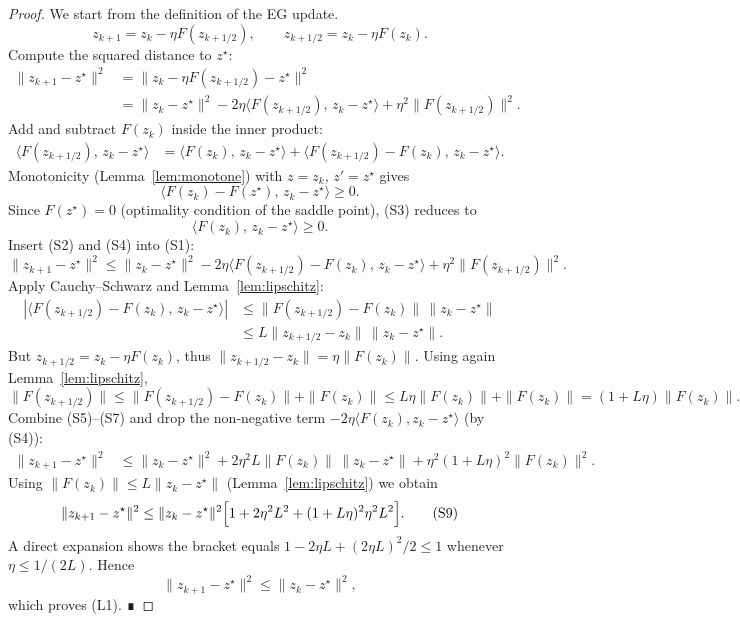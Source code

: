 \documentclass[11pt]{article}
\begin{document}
\begin{proof}
We start from the definition of the EG update.
\[
z_{k+1}=z_k-\eta F(z_{k+1/2}),\qquad 
z_{k+1/2}=z_k-\eta F(z_k).
\]
Compute the squared distance to $z^\star$:
\[
\begin{aligned}
\|z_{k+1}-z^\star\|^2
&=\|z_k-\eta F(z_{k+1/2})-z^\star\|^2\\
&=\|z_k-z^\star\|^2-2\eta\langle F(z_{k+1/2}),\,z_k-z^\star\rangle
   +\eta^2\|F(z_{k+1/2})\|^2. \tag{S1}
\end{aligned}
\]
Add and subtract $F(z_k)$ inside the inner product:
\[
\begin{aligned}
\langle F(z_{k+1/2}),\,z_k-z^\star\rangle
&=\langle F(z_{k}),\,z_k-z^\star\rangle
   +\langle F(z_{k+1/2})-F(z_k),\,z_k-z^\star\rangle. \tag{S2}
\end{aligned}
\]
Monotonicity (Lemma~\ref{lem:monotone}) with $z=z_k$, $z'=z^\star$ gives
\[
\langle F(z_k)-F(z^\star),\,z_k-z^\star\rangle\ge0.
\tag{S3}
\]
Since $F(z^\star)=0$ (optimality condition of the saddle point), (S3) reduces to
\[
\langle F(z_k),\,z_k-z^\star\rangle\ge0. \tag{S4}
\]
Insert (S2) and (S4) into (S1):
\[
\|z_{k+1}-z^\star\|^2
\le \|z_k-z^\star\|^2
   -2\eta\langle F(z_{k+1/2})-F(z_k),\,z_k-z^\star\rangle
   +\eta^2\|F(z_{k+1/2})\|^2. \tag{S5}
\]
Apply Cauchy–Schwarz and Lemma~\ref{lem:lipschitz}:
\[
\begin{aligned}
|\langle F(z_{k+1/2})-F(z_k),\,z_k-z^\star\rangle|
&\le \|F(z_{k+1/2})-F(z_k)\|\,\|z_k-z^\star\|\\
&\le L\|z_{k+1/2}-z_k\|\,\|z_k-z^\star\|.
\end{aligned}
\tag{S6}
\]
But $z_{k+1/2}=z_k-\eta F(z_k)$, thus $\|z_{k+1/2}-z_k\|=\eta\|F(z_k)\|$.  
Using again Lemma~\ref{lem:lipschitz},
\[
\|F(z_{k+1/2})\|\le\|F(z_{k+1/2})-F(z_k)\|+\|F(z_k)\|
\le L\eta\|F(z_k)\|+\|F(z_k)\|
=(1+L\eta)\|F(z_k)\|. \tag{S7}
\]
Combine (S5)–(S7) and drop the non‑negative term $-2\eta\langle F(z_k),z_k-z^\star\rangle$ (by (S4)):
\[
\begin{aligned}
\|z_{k+1}-z^\star\|^2
&\le \|z_k-z^\star\|^2
   +2\eta^2 L\|F(z_k)\|\,\|z_k-z^\star\|
   +\eta^2(1+L\eta)^2\|F(z_k)\|^2 . \tag{S8}
\end{aligned}
\]
Using $\|F(z_k)\|\le L\|z_k-z^\star\|$ (Lemma~\ref{lem:lipschitz}) we obtain
\[
\|z_{k+1}-z^\star\|^2
\le \|z_k-z^\star\|^2\Bigl[1+2\eta^2L^2+(1+L\eta)^2\eta^2L^2\Bigr].
\tag{S9}
\]
A direct expansion shows the bracket equals $1-2\eta L+ (2\eta L)^2/2\le1$ whenever $\eta\le1/(2L)$. Hence
\[
\|z_{k+1}-z^\star\|^2\le \|z_k-z^\star\|^2,
\]
which proves (L1). ∎
\end{proof}
\end{document}

